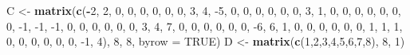 \documentclass[]{article}
\newenvironment{Shaded}{\begin{snugshade}}{\end{snugshade}}
\newcommand{\DataTypeTok}[1]{\textcolor[rgb]{0.13,0.29,0.53}{#1}}
\newcommand{\DecValTok}[1]{\textcolor[rgb]{0.00,0.00,0.81}{#1}}
\newcommand{\KeywordTok}[1]{\textcolor[rgb]{0.13,0.29,0.53}{\textbf{#1}}}
\newcommand{\NormalTok}[1]{#1}
\newcommand{\OperatorTok}[1]{\textcolor[rgb]{0.81,0.36,0.00}{\textbf{#1}}}
\newcommand{\OtherTok}[1]{\textcolor[rgb]{0.56,0.35,0.01}{#1}}
\newcommand{\StringTok}[1]{\textcolor[rgb]{0.31,0.60,0.02}{#1}}
\begin{document}
\begin{Shaded}
\begin{Highlighting}[]
\NormalTok{C <-}\StringTok{ }\KeywordTok{matrix}\NormalTok{(}\KeywordTok{c}\NormalTok{(}\OperatorTok{-}\DecValTok{2}\NormalTok{, }\DecValTok{2}\NormalTok{, }\DecValTok{0}\NormalTok{, }\DecValTok{0}\NormalTok{, }\DecValTok{0}\NormalTok{, }\DecValTok{0}\NormalTok{, }\DecValTok{0}\NormalTok{, }\DecValTok{0}\NormalTok{,}
              \DecValTok{3}\NormalTok{, }\DecValTok{4}\NormalTok{, }\DecValTok{-5}\NormalTok{, }\DecValTok{0}\NormalTok{, }\DecValTok{0}\NormalTok{, }\DecValTok{0}\NormalTok{, }\DecValTok{0}\NormalTok{, }\DecValTok{0}\NormalTok{,}
              \DecValTok{0}\NormalTok{, }\DecValTok{3}\NormalTok{, }\DecValTok{1}\NormalTok{, }\DecValTok{0}\NormalTok{, }\DecValTok{0}\NormalTok{, }\DecValTok{0}\NormalTok{, }\DecValTok{0}\NormalTok{, }\DecValTok{0}\NormalTok{,}
              \DecValTok{0}\NormalTok{, }\DecValTok{0}\NormalTok{, }\DecValTok{-1}\NormalTok{, }\DecValTok{-1}\NormalTok{, }\DecValTok{-1}\NormalTok{, }\DecValTok{0}\NormalTok{, }\DecValTok{0}\NormalTok{, }\DecValTok{0}\NormalTok{,}
              \DecValTok{0}\NormalTok{, }\DecValTok{0}\NormalTok{, }\DecValTok{0}\NormalTok{, }\DecValTok{3}\NormalTok{, }\DecValTok{4}\NormalTok{, }\DecValTok{7}\NormalTok{, }\DecValTok{0}\NormalTok{, }\DecValTok{0}\NormalTok{,}
              \DecValTok{0}\NormalTok{, }\DecValTok{0}\NormalTok{, }\DecValTok{0}\NormalTok{, }\DecValTok{0}\NormalTok{, }\DecValTok{-6}\NormalTok{, }\DecValTok{6}\NormalTok{, }\DecValTok{1}\NormalTok{, }\DecValTok{0}\NormalTok{,}
              \DecValTok{0}\NormalTok{, }\DecValTok{0}\NormalTok{, }\DecValTok{0}\NormalTok{, }\DecValTok{0}\NormalTok{, }\DecValTok{0}\NormalTok{, }\DecValTok{1}\NormalTok{, }\DecValTok{1}\NormalTok{, }\DecValTok{1}\NormalTok{,}
              \DecValTok{0}\NormalTok{, }\DecValTok{0}\NormalTok{, }\DecValTok{0}\NormalTok{, }\DecValTok{0}\NormalTok{, }\DecValTok{0}\NormalTok{, }\DecValTok{0}\NormalTok{, }\DecValTok{-1}\NormalTok{, }\DecValTok{4}\NormalTok{), }\DecValTok{8}\NormalTok{, }\DecValTok{8}\NormalTok{, }\DataTypeTok{byrow =} \OtherTok{TRUE}\NormalTok{)}
\NormalTok{D <-}\StringTok{ }\KeywordTok{matrix}\NormalTok{(}\KeywordTok{c}\NormalTok{(}\DecValTok{1}\NormalTok{,}\DecValTok{2}\NormalTok{,}\DecValTok{3}\NormalTok{,}\DecValTok{4}\NormalTok{,}\DecValTok{5}\NormalTok{,}\DecValTok{6}\NormalTok{,}\DecValTok{7}\NormalTok{,}\DecValTok{8}\NormalTok{), }\DecValTok{8}\NormalTok{, }\DecValTok{1}\NormalTok{)}
\end{Highlighting}
\end{Shaded}
\end{document}
